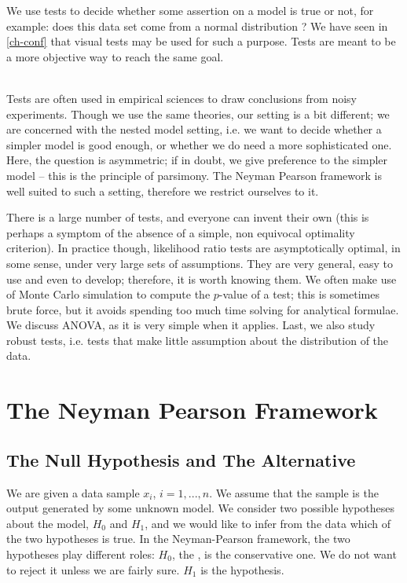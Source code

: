 \begin{minipage}[b]{0.40\textwidth}
We use tests to decide whether some assertion on a model is
true or not, for example: does this data set come from a normal
distribution ? We have seen in \cref{ch-conf} that visual tests
may be used for such a purpose. Tests are meant to be a more
objective way to reach the same goal.

%
\end{minipage}
%
\begin{minipage}[b]{0.60\textwidth}
\end{minipage}\hfill\\
%


Tests are often used in empirical sciences to draw conclusions from
noisy experiments. Though we use the same theories, our setting is a
bit different; we are concerned with the nested model setting, i.e.
we want to decide whether a simpler model is good enough, or whether
we do need a more sophisticated one. Here, the question is
asymmetric; if in doubt, we give preference to the simpler model --
this is the principle of parsimony. The Neyman Pearson framework is
well suited to such a setting, therefore we restrict ourselves to
it.

There is a large number of tests, and everyone can invent their
own (this is perhaps a symptom of the absence of a simple, non
equivocal optimality criterion). In practice though, likelihood
ratio tests are asymptotically optimal, in some sense, under
very large sets of assumptions. They are very general, easy to
use and even to develop; therefore, it is worth knowing them.
We often make use of Monte Carlo simulation to compute the
$p$-value of a test; this is sometimes brute force, but it
avoids spending too much time solving for analytical formulae.
We discuss ANOVA, as it is very simple when it applies. Last,
we also study robust tests, i.e. tests that make little
assumption about the distribution of the data.
%
\minitoc
%
\section{The Neyman Pearson Framework}
%
%
\subsection{The Null Hypothesis and The Alternative}
We are given a data sample $x_i$, $i=1,...,n$. We assume that
the sample is the output generated by some unknown model. We
consider two possible hypotheses about the model, $H_0$ and
$H_1$, and we would like to infer from the data which of the
two hypotheses is true. In the Neyman-Pearson framework, the
two hypotheses play different roles: $H_0$, the , is the conservative one. We do not want to reject
it unless we are fairly sure. $H_1$ is the 
hypothesis.

